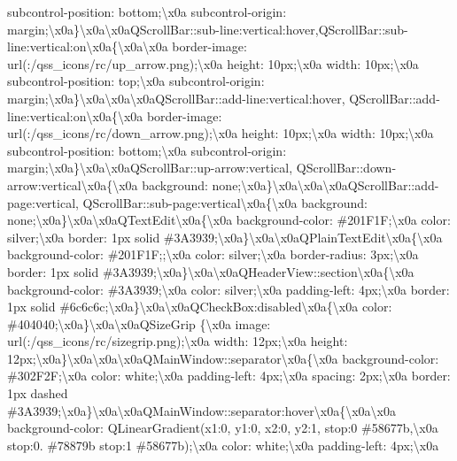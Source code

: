 subcontrol-\/position\+: bottom;\textbackslash{}x0a subcontrol-\/origin\+: margin;\textbackslash{}x0a\}\textbackslash{}x0a\textbackslash{}x0a\+Q\+Scroll\+Bar\+::sub-\/line\+:vertical\+:hover,\+Q\+Scroll\+Bar\+::sub-\/line\+:vertical\+:on\textbackslash{}x0a\{\textbackslash{}x0a\textbackslash{}x0a border-\/image\+: url(\+:/qss\+\_\+icons/rc/up\+\_\+arrow.\+png);\textbackslash{}x0a height\+: 10px;\textbackslash{}x0a width\+: 10px;\textbackslash{}x0a subcontrol-\/position\+: top;\textbackslash{}x0a subcontrol-\/origin\+: margin;\textbackslash{}x0a\}\textbackslash{}x0a\textbackslash{}x0a\textbackslash{}x0a\+Q\+Scroll\+Bar\+::add-\/line\+:vertical\+:hover, Q\+Scroll\+Bar\+::add-\/line\+:vertical\+:on\textbackslash{}x0a\{\textbackslash{}x0a border-\/image\+: url(\+:/qss\+\_\+icons/rc/down\+\_\+arrow.\+png);\textbackslash{}x0a height\+: 10px;\textbackslash{}x0a width\+: 10px;\textbackslash{}x0a subcontrol-\/position\+: bottom;\textbackslash{}x0a subcontrol-\/origin\+: margin;\textbackslash{}x0a\}\textbackslash{}x0a\textbackslash{}x0a\+Q\+Scroll\+Bar\+::up-\/arrow\+:vertical, Q\+Scroll\+Bar\+::down-\/arrow\+:vertical\textbackslash{}x0a\{\textbackslash{}x0a background\+: none;\textbackslash{}x0a\}\textbackslash{}x0a\textbackslash{}x0a\textbackslash{}x0a\+Q\+Scroll\+Bar\+::add-\/page\+:vertical, Q\+Scroll\+Bar\+::sub-\/page\+:vertical\textbackslash{}x0a\{\textbackslash{}x0a background\+: none;\textbackslash{}x0a\}\textbackslash{}x0a\textbackslash{}x0a\+Q\+Text\+Edit\textbackslash{}x0a\{\textbackslash{}x0a background-\/color\+: \#201\+F1\+F;\textbackslash{}x0a color\+: silver;\textbackslash{}x0a border\+: 1px solid \#3\+A3939;\textbackslash{}x0a\}\textbackslash{}x0a\textbackslash{}x0a\+Q\+Plain\+Text\+Edit\textbackslash{}x0a\{\textbackslash{}x0a background-\/color\+: \#201\+F1\+F;;\textbackslash{}x0a color\+: silver;\textbackslash{}x0a border-\/radius\+: 3px;\textbackslash{}x0a border\+: 1px solid \#3\+A3939;\textbackslash{}x0a\}\textbackslash{}x0a\textbackslash{}x0a\+Q\+Header\+View\+::section\textbackslash{}x0a\{\textbackslash{}x0a background-\/color\+: \#3\+A3939;\textbackslash{}x0a color\+: silver;\textbackslash{}x0a padding-\/left\+: 4px;\textbackslash{}x0a border\+: 1px solid \#6c6c6c;\textbackslash{}x0a\}\textbackslash{}x0a\textbackslash{}x0a\+Q\+Check\+Box\+:disabled\textbackslash{}x0a\{\textbackslash{}x0a color\+: \#404040;\textbackslash{}x0a\}\textbackslash{}x0a\textbackslash{}x0a\+Q\+Size\+Grip \{\textbackslash{}x0a image\+: url(\+:/qss\+\_\+icons/rc/sizegrip.\+png);\textbackslash{}x0a width\+: 12px;\textbackslash{}x0a height\+: 12px;\textbackslash{}x0a\}\textbackslash{}x0a\textbackslash{}x0a\textbackslash{}x0a\+Q\+Main\+Window\+::separator\textbackslash{}x0a\{\textbackslash{}x0a background-\/color\+: \#302\+F2\+F;\textbackslash{}x0a color\+: white;\textbackslash{}x0a padding-\/left\+: 4px;\textbackslash{}x0a spacing\+: 2px;\textbackslash{}x0a border\+: 1px dashed \#3\+A3939;\textbackslash{}x0a\}\textbackslash{}x0a\textbackslash{}x0a\+Q\+Main\+Window\+::separator\+:hover\textbackslash{}x0a\{\textbackslash{}x0a\textbackslash{}x0a background-\/color\+: Q\+Linear\+Gradient(x1\+:0, y1\+:0, x2\+:0, y2\+:1, stop\+:0 \#58677b,\textbackslash{}x0a stop\+:0. \#78879b stop\+:1 \#58677b);\textbackslash{}x0a color\+: white;\textbackslash{}x0a padding-\/left\+: 4px;\textbackslash{}x0a 